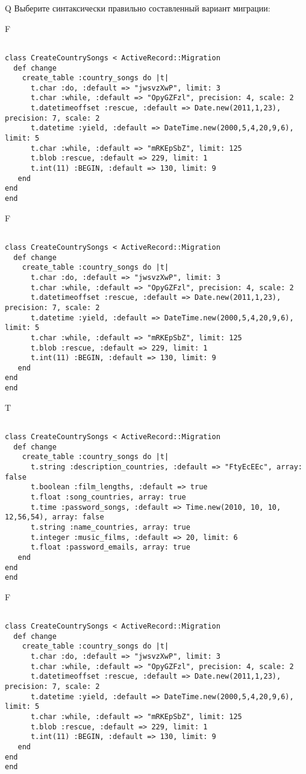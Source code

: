 Q
Выберите синтаксически правильно составленный вариант миграции:

F
\begin{verbatim}
		
class CreateCountrySongs < ActiveRecord::Migration 
  def change 
    create_table :country_songs do |t| 
      t.char :do, :default => "jwsvzXwP", limit: 3
      t.char :while, :default => "OpyGZFzl", precision: 4, scale: 2
      t.datetimeoffset :rescue, :default => Date.new(2011,1,23), precision: 7, scale: 2
      t.datetime :yield, :default => DateTime.new(2000,5,4,20,9,6), limit: 5
      t.char :while, :default => "mRKEpSbZ", limit: 125
      t.blob :rescue, :default => 229, limit: 1
      t.int(11) :BEGIN, :default => 130, limit: 9
   end
end
end
\end{verbatim}

F
\begin{verbatim}
		
class CreateCountrySongs < ActiveRecord::Migration 
  def change 
    create_table :country_songs do |t| 
      t.char :do, :default => "jwsvzXwP", limit: 3
      t.char :while, :default => "OpyGZFzl", precision: 4, scale: 2
      t.datetimeoffset :rescue, :default => Date.new(2011,1,23), precision: 7, scale: 2
      t.datetime :yield, :default => DateTime.new(2000,5,4,20,9,6), limit: 5
      t.char :while, :default => "mRKEpSbZ", limit: 125
      t.blob :rescue, :default => 229, limit: 1
      t.int(11) :BEGIN, :default => 130, limit: 9
   end
end
end
\end{verbatim}

T
\begin{verbatim}
		
class CreateCountrySongs < ActiveRecord::Migration 
  def change 
    create_table :country_songs do |t| 
      t.string :description_countries, :default => "FtyEcEEc", array: false
      t.boolean :film_lengths, :default => true
      t.float :song_countries, array: true
      t.time :password_songs, :default => Time.new(2010, 10, 10, 12,56,54), array: false
      t.string :name_countries, array: true
      t.integer :music_films, :default => 20, limit: 6
      t.float :password_emails, array: true
   end
end
end
\end{verbatim}

F
\begin{verbatim}
		
class CreateCountrySongs < ActiveRecord::Migration 
  def change 
    create_table :country_songs do |t| 
      t.char :do, :default => "jwsvzXwP", limit: 3
      t.char :while, :default => "OpyGZFzl", precision: 4, scale: 2
      t.datetimeoffset :rescue, :default => Date.new(2011,1,23), precision: 7, scale: 2
      t.datetime :yield, :default => DateTime.new(2000,5,4,20,9,6), limit: 5
      t.char :while, :default => "mRKEpSbZ", limit: 125
      t.blob :rescue, :default => 229, limit: 1
      t.int(11) :BEGIN, :default => 130, limit: 9
   end
end
end
\end{verbatim}

